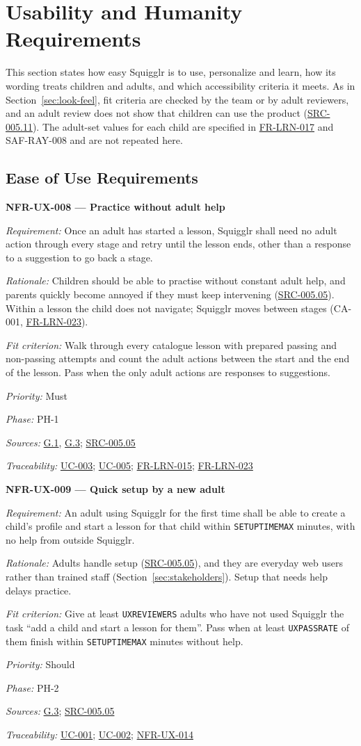 \documentclass[12pt]{article}
\renewcommand{\_}{\textunderscore\allowbreak}%
\newcommand{\goalref}[1]{\hyperref[goal:#1]{G.#1}}
\newcommand{\ucref}[1]{\hyperref[uc:#1]{\mbox{UC-#1}}}
\newenvironment{srsrequirement}[2]{%
  \par\medskip\noindent\phantomsection\label{req:#1}%
  \textbf{#1 --- #2}\par\nobreak\smallskip }{\par\medskip}
\newcommand{\reqfield}[2]{\noindent\textit{#1:} #2\par}
\newcommand{\reqshall}[1]{\reqfield{Requirement}{#1}}
\newcommand{\reqrationale}[1]{\reqfield{Rationale}{#1}}
\newcommand{\reqfit}[1]{\reqfield{Fit criterion}{#1}}
\newcommand{\reqpriority}[1]{\reqfield{Priority}{#1}}
\newcommand{\reqphase}[1]{\reqfield{Phase}{#1}}
\newcommand{\reqsources}[1]{\reqfield{Sources}{#1}}
\newcommand{\reqtraces}[1]{\reqfield{Traceability}{#1}}
\newcommand{\reqref}[1]{\hyperref[req:#1]{#1}}
\newcommand{\srcref}[1]{\hyperref[src:#1]{SRC-#1}}
\providecommand{\ucref}[1]{\hyperref[uc:#1]{UC-#1}}
\begin{document}
\section{Usability and Humanity Requirements}
\label{sec:usability}
\begingroup
\sloppy

This section states how easy Squigglr is to use, personalize and learn, how its
wording treats children and adults, and which accessibility criteria it meets.
As in Section~\ref{sec:look-feel}, fit criteria are checked by the team or by
adult reviewers, and an adult review does not show that children can use the
product (\srcref{005.11}). The adult-set values for each child are specified in
\mbox{\reqref{FR-LRN-017}} and SAF-RAY-008 and are not repeated here.

\subsection{Ease of Use Requirements}
\label{sec:ease-of-use}

\begin{srsrequirement}{NFR-UX-008}{Practice without adult help}
  \reqshall{Once an adult has started a lesson, Squigglr shall need no adult
action through every stage and retry until the lesson ends, other than a
response to a suggestion to go back a stage.} \reqrationale{Children should be
able to practise without constant adult help, and parents quickly become annoyed
if they must keep intervening (\srcref{005.05}). Within a lesson the child does
not navigate; Squigglr moves between stages (CA-001,
\mbox{\reqref{FR-LRN-023}}).} \reqfit{Walk through every catalogue lesson with
prepared passing and non-passing attempts and count the adult actions between
the start and the end of the lesson. Pass when the only adult actions are
responses to suggestions.}
  \reqpriority{Must}
  \reqphase{PH-1}
  \reqsources{\goalref{1}, \goalref{3}; \srcref{005.05}} \reqtraces{\ucref{003};
  \ucref{005}; \mbox{\reqref{FR-LRN-015}}; \mbox{\reqref{FR-LRN-023}}}
\end{srsrequirement}

\begin{srsrequirement}{NFR-UX-009}{Quick setup by a new adult}
  \reqshall{An adult using Squigglr for the first time shall be able to create a
child's profile and start a lesson for that child within
\texttt{SETUP\_TIME\_MAX} minutes, with no help from outside Squigglr.}
\reqrationale{Adults handle setup (\srcref{005.05}), and they are everyday web
users rather than trained staff (Section~\ref{sec:stakeholders}). Setup that
needs help delays practice.} \reqfit{Give at least \texttt{UX\_REVIEWERS} adults
who have not used Squigglr the task ``add a child and start a lesson for them''.
Pass when at least \texttt{UX\_PASS\_RATE} of them finish within
\texttt{SETUP\_TIME\_MAX} minutes without help.}
  \reqpriority{Should}
  \reqphase{PH-2}
  \reqsources{\goalref{3}; \srcref{005.05}} \reqtraces{\ucref{001}; \ucref{002};
  \reqref{NFR-UX-014}}
\end{srsrequirement}
\end{document}
